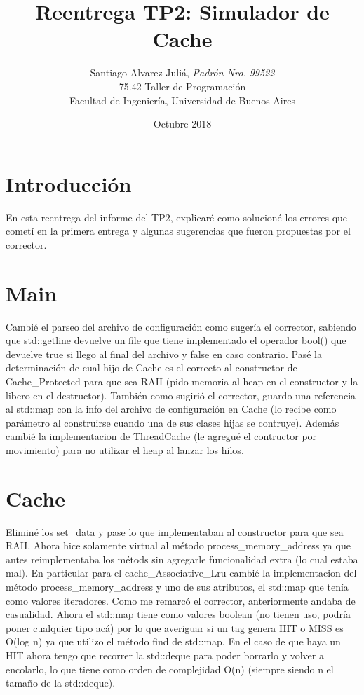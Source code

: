 \documentclass[a4paper,12pt]{report}
\title{Reentrega TP2: Simulador de Cache}
\author{Santiago Alvarez Juli\'a, \textit{Padr\'on Nro. 99522}                     \\
            \normalsize{75.42 Taller de Programaci\'on}                             \\
            \normalsize{Facultad de Ingenier\'ia, Universidad de Buenos Aires}            \\
       }
\date{Octubre 2018}
\begin{document}
\maketitle

\thispagestyle{empty}

\tableofcontents
\newpage
{}

\section{Introducci\'on}

En esta reentrega del informe del TP2, explicar\'e como solucion\'e los errores que comet\'i en la primera entrega y algunas sugerencias que fueron propuestas por el corrector.

\section{Main}

Cambi\'e el parseo del archivo de configuraci\'on como suger\'ia el corrector, sabiendo que std::getline devuelve un file que tiene implementado el operador bool() que devuelve true si llego al final del archivo y false en caso contrario.  Pas\'e la determinaci\'on de cual hijo de Cache es el correcto al constructor de Cache\_Protected para que sea RAII (pido memoria al heap en el constructor y la libero en el destructor). Tambi\'en como sugiri\'o el corrector, guardo una referencia al std::map con la info del archivo de configuraci\'on en Cache (lo recibe como par\'ametro al construirse cuando una de sus clases hijas se contruye). Adem\'as cambi\'e la implementacion de ThreadCache (le agregu\'e el contructor por movimiento) para no utilizar el heap al lanzar los hilos.

 \section{Cache}

Elimin\'e los set\_data y pase lo que implementaban al constructor para que sea RAII. Ahora hice solamente virtual al m\'etodo process\_memory\_address ya que antes reimplementaba los m\'etods sin agregarle funcionalidad extra (lo cual estaba mal). En particular para el cache\_Associative\_Lru cambi\'e la implementacion del m\'etodo process\_memory\_address y uno de sus atributos, el std::map que ten\'ia como valores iteradores. Como me remarc\'o el corrector, anteriormente andaba de casualidad. Ahora el std::map tiene como valores boolean (no tienen uso, podr\'ia poner cualquier tipo ac\'a) por lo que averiguar si un tag genera HIT o MISS es O(log n) ya que utilizo el m\'etodo find de std::map. En el caso de que haya un HIT ahora tengo que recorrer la std::deque para poder borrarlo y volver a encolarlo, lo que tiene como orden de complejidad O(n) (siempre siendo n el tama\~no de la std::deque).
\end{document}
